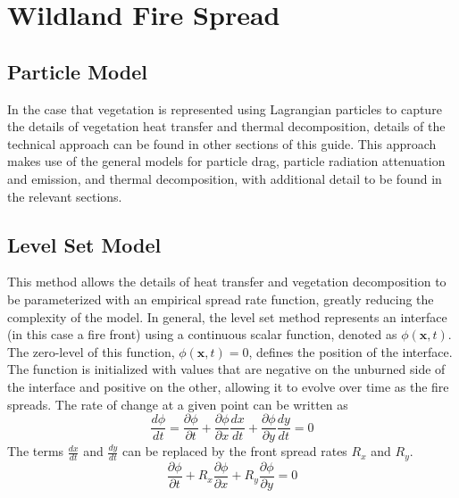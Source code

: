 






\chapter{Wildland Fire Spread}
\label{sec:wildland_spread}

\section{Particle Model}

In the case that vegetation is represented using Lagrangian particles to capture the details of vegetation heat transfer and thermal decomposition, details of the technical approach can be found in other sections of this guide. This approach makes use of the general models for particle drag, particle radiation attenuation and emission, and thermal decomposition, with additional detail to be found in the relevant sections.

\section{Level Set Model}

This method allows the details of heat transfer and vegetation decomposition to be parameterized with an empirical spread rate function, greatly reducing the complexity of the model. In general, the level set method represents an interface (in this case a fire front) using a continuous scalar function, denoted as $\phi(\mathbf{x},t)$. The zero-level of this function, $\phi(\mathbf{x},t)=0$, defines the position of the interface. The function is initialized with values that are negative on the unburned side of the interface and positive on the other, allowing it to evolve over time as the fire spreads. The rate of change at a given point can be written as
\begin{equation}
\frac{d\phi}{dt} = \frac{\partial\phi}{\partial t} + \frac{\partial\phi}{\partial x}\frac{dx}{dt} + \frac{\partial\phi}{\partial y}\frac{dy}{dt} = 0
\end{equation}
The terms $\frac{dx}{dt}$ and $\frac{dy}{dt}$ can be replaced by the front spread rates $R_x$ and $R_y$.
\begin{equation}
\frac{\partial\phi}{\partial t} + R_x\frac{\partial\phi}{\partial x} + R_y\frac{\partial\phi}{\partial y} = 0
\label{eq:level_set}
\end{equation}


